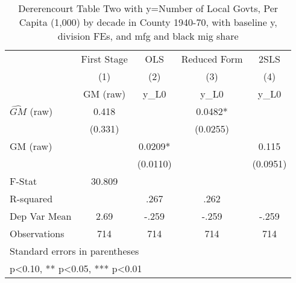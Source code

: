 \begin{table}[htbp]\centering
\def\sym#1{\ifmmode^{#1}\else\(^{#1}\)\fi}
\caption{Dererencourt Table Two with y=Number of Local Govts, Per Capita (1,000) by decade in County 1940-70, with baseline y, division FEs, and mfg and black mig share}
\begin{tabular}{l*{4}{c}}
\toprule
                    & First Stage   &         OLS   &Reduced Form   &        2SLS   \\
                    &\multicolumn{1}{c}{(1)}&\multicolumn{1}{c}{(2)}&\multicolumn{1}{c}{(3)}&\multicolumn{1}{c}{(4)}\\
                    &\multicolumn{1}{c}{GM  (raw)}&\multicolumn{1}{c}{y\_L0}&\multicolumn{1}{c}{y\_L0}&\multicolumn{1}{c}{y\_L0}\\
\midrule
$\hat{GM}$ (raw)    &       0.418   &               &      0.0482*  &               \\
                    &     (0.331)   &               &    (0.0255)   &               \\
\addlinespace
GM  (raw)           &               &      0.0209*  &               &       0.115   \\
                    &               &    (0.0110)   &               &    (0.0951)   \\
\midrule
F-Stat              &      30.809   &               &               &               \\
R-squared           &               &        .267   &        .262   &               \\
Dep Var Mean        &        2.69   &       -.259   &       -.259   &       -.259   \\
Observations        &         714   &         714   &         714   &         714   \\
\bottomrule
\multicolumn{5}{l}{\footnotesize Standard errors in parentheses}\\
\multicolumn{5}{l}{\footnotesize * p<0.10, ** p<0.05, *** p<0.01}\\
\end{tabular}
\end{table}
